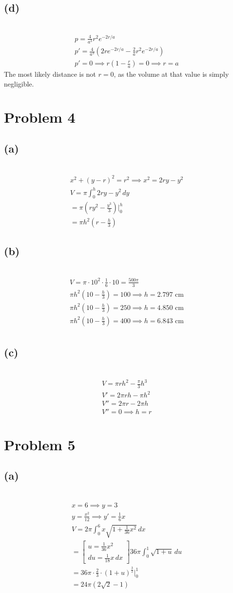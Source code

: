 \documentclass[12pt]{article}
\newcommand{\at}{\Big|}
\newcommand{\problem}[1]{\section{Problem #1}}
\newcommand{\subproblem}[1]{\subsection{(#1)} \,}
\begin{document}
\subproblem{d}
\begin{gather*}
    p=\frac{4}{a^3}r^2 e^{-2r/a}\\
    p'=\frac{4}{a^3}(2re^{-2r/a}-\frac{2}{a}r^2e^{-2r/a})\\
    p'=0 \implies r(1-\frac{r}{a})=0 \implies r=\boxed{a}
\end{gather*}
The most likely distance is not $r=0$, as the volume at that value is simply negligible. 

\problem{4}

\subproblem{a}
\begin{gather*}
    x^2+(y-r)^2=r^2 \implies x^2=2ry-y^2\\
    V=\pi \int_0^h 2ry-y^2\, dy\\
    = \pi (ry^2-\frac{y^3}{3})\at_0^h\\
    = \boxed{\pi h^2 (r-\frac{h}{3})}
\end{gather*}

\subproblem{b}
\begin{gather*}
    V=\pi \cdot 10^2\cdot \frac{1}{6}\cdot 10= \frac{500\pi}{3}\\
    \pi h^2(10-\frac{h}{3}) =100 \implies h= 2.797\text{ cm}\\
    \pi h^2(10-\frac{h}{3}) =250 \implies h= 4.850\text{ cm}\\
    \pi h^2(10-\frac{h}{3}) =400 \implies h= 6.843\text{ cm}\\
\end{gather*}

\subproblem{c}
\begin{gather*}
    V=\pi rh^2  - \frac{\pi}{3}h^3\\
    V'= 2\pi r h -\pi h^2\\
    V'' = 2\pi r -2\pi h\\
    V''=0 \implies \boxed{h=r}
\end{gather*}

\problem{5}

\subproblem{a}
\begin{gather*}
    x=6 \implies y=3\\
    y=\frac{x^2}{12} \implies y'= \frac{1}{6}x\\
    V=2\pi \int_0^6  x \sqrt{1+\frac{1}{36}x^2} \, dx\\
    = \begin{bmatrix}
        u=\frac{1}{36}x^2\\
        du= \frac{1}{18} x\, dx
    \end{bmatrix} 36\pi \int_0^1 \sqrt{1+u} \, du\\
    = 36\pi \cdot \frac{2}{3} \cdot (1+u)^\frac{3}{2}\at_0^1\\
    =\boxed{24\pi  (2\sqrt{2} - 1)}
\end{gather*}
\end{document}
